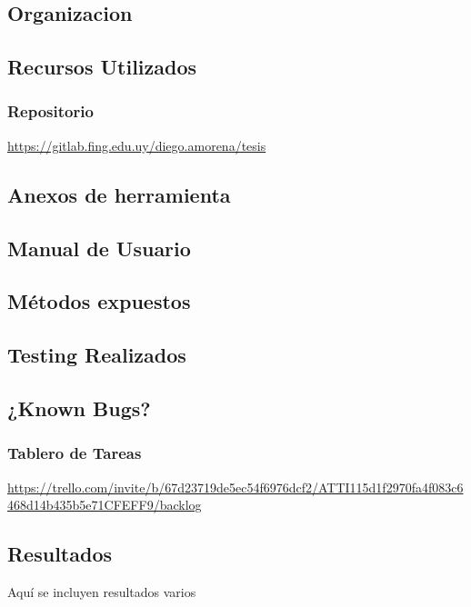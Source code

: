 \documentclass{../../prgrado}
\begin{document}
\begin{appendix}
\chapter{Organizacion}
\section{Recursos Utilizados}
\subsection{Repositorio}
\url{https://gitlab.fing.edu.uy/diego.amorena/tesis}
\end{appendix}
\begin{appendix}

\chapter{Anexos de herramienta}
\section{Manual de Usuario}

\section{Métodos expuestos}

\section{Testing Realizados}
\section{¿Known Bugs?}

\subsection{Tablero de Tareas}
\url{https://trello.com/invite/b/67d23719de5ec54f6976dcf2/ATTI115d1f2970fa4f083c6468d14b435b5e71CFEFF9/backlog}
\end{appendix}
\begin{appendix}
\chapter{Resultados}
Aquí se incluyen resultados varios
\end{appendix}



\end{document}
